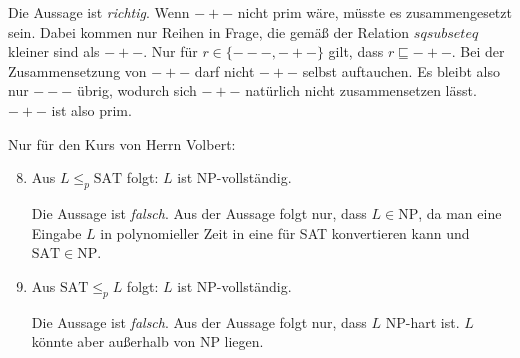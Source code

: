 \documentclass[11pt,a4paper]{article}
\begin{document}
\begin{loesung}
\begin{enumerate}
        Die Aussage ist \emph{richtig}.
        Wenn $-+-$ nicht prim wäre, müsste es zusammengesetzt sein.
        Dabei kommen nur Reihen in Frage, die gemäß der Relation $sqsubseteq$ kleiner sind als $-+-$.
        Nur für $r \in \{---, -+-\}$ gilt, dass $r \sqsubseteq -+-$.
        Bei der Zusammensetzung von $-+-$ darf nicht $-+-$ selbst auftauchen.
        Es bleibt also nur $---$ übrig, wodurch sich $-+-$ natürlich nicht zusammensetzen lässt.
        $-+-$ ist also prim.
    \end{enumerate}
    Nur für den Kurs von Herrn Volbert:
    \begin{enumerate}
        \setcounter{enumi}{7}
        \item Aus $L \leq_p \mathrm{SAT}$ folgt: $L$ ist NP-vollständig.

        Die Aussage ist \emph{falsch}.
        Aus der Aussage folgt nur, dass $L \in \mathrm{NP}$, da man eine Eingabe $L$ in polynomieller Zeit in eine für SAT konvertieren kann und $\mathrm{SAT} \in \mathrm{NP}$.
        \item Aus $\mathrm{SAT} \leq_p L$ folgt: $L$ ist NP-vollständig.

        Die Aussage ist \emph{falsch}.
        Aus der Aussage folgt nur, dass $L$ NP-hart ist.
        $L$ könnte aber außerhalb von NP liegen.
    \end{enumerate}
\end{loesung}
\end{document}
